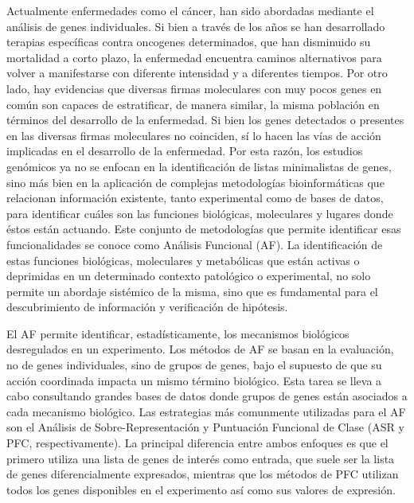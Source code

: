 \documentclass[12pt,twoside]{reedthesis}
\begin{document}
Actualmente enfermedades como el cáncer, han sido abordadas mediante el análisis de genes individuales. Si bien a través de los años se han desarrollado terapias específicas contra oncogenes determinados, que han disminuido su mortalidad a corto plazo, la enfermedad encuentra caminos alternativos para volver a manifestarse con diferente intensidad y a diferentes tiempos. Por otro lado, hay evidencias que diversas firmas moleculares con muy pocos genes en común son capaces de estratificar, de manera similar, la misma población en términos del desarrollo de la enfermedad. Si bien los genes detectados o presentes en las diversas firmas moleculares no coinciden, sí lo hacen las vías de acción implicadas en el desarrollo de la enfermedad. Por esta razón, los estudios genómicos ya no se enfocan en la identificación de listas minimalistas de genes, sino más bien en la aplicación de complejas metodologías bioinformáticas que relacionan información existente, tanto experimental como de bases de datos, para identificar cuáles son las funciones biológicas, moleculares y lugares donde éstos están actuando. Este conjunto de metodologías que permite identificar esas funcionalidades se conoce como Análisis Funcional (AF). La identificación de estas funciones biológicas, moleculares y metabólicas que están activas o deprimidas en un determinado contexto patológico o experimental, no solo permite un abordaje sistémico de la misma, sino que es fundamental para el descubrimiento de información y verificación de hipótesis.

\par

El AF permite identificar, estadísticamente, los mecanismos biológicos desregulados en un experimento. Los métodos de AF se basan en la evaluación, no de genes individuales, sino de grupos de genes, bajo el supuesto de que su acción coordinada impacta un mismo término biológico. Esta tarea se lleva a cabo consultando grandes bases de datos donde grupos de genes están asociados a cada mecanismo biológico. Las estrategias más comunmente utilizadas para el AF son el Análisis de Sobre-Representación y Puntuación Funcional de Clase (ASR y PFC, respectivamente). La principal diferencia entre ambos enfoques es que el primero utiliza una lista de genes de interés como entrada, que suele ser la lista de genes diferencialmente expresados, mientras que los métodos de PFC utilizan todos los genes disponibles en el experimento así como sus valores de expresión.

\par
\end{document}
